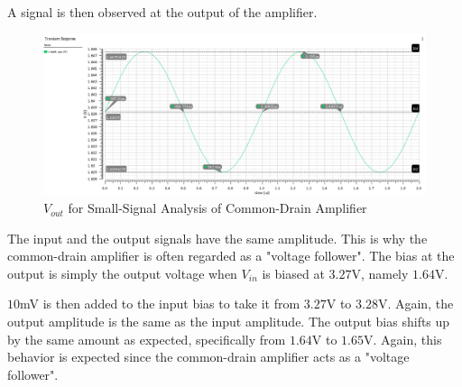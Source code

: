 \FloatBarrier

A signal is then observed at the output of the amplifier.

\FloatBarrier

\begin{figure}[h!]
	\centering
	\includegraphics[scale=0.45]{../images/sim1_vout.PNG}
	\caption{$V_{out}$ for Small-Signal Analysis of Common-Drain Amplifier}
	\label{fig:sim1_vout}
\end{figure}

\FloatBarrier

The input and the output signals have the same amplitude.
This is why the common-drain amplifier is often regarded as a "voltage follower".
The bias at the output is simply the output voltage when $V_{in}$ is biased at $3.27$\si{\volt}, namely $1.64$\si{\volt}.

$10$\si{\milli\volt} is then added to the input bias to take it from $3.27$\si{\volt} to $3.28$\si{\volt}.
Again, the output amplitude is the same as the input amplitude.
The output bias shifts up by the same amount as expected, specifically from $1.64$\si{\volt} to $1.65$\si{\volt}.
Again, this behavior is expected since the common-drain amplifier acts as a "voltage follower".
